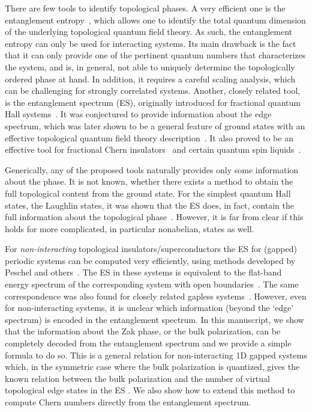 \documentclass[twocolumn,amsmath,longbibliography,amssymb,superscriptaddress]{revtex4-1}
\newcommand{\mariac}[1]{{\it\color{cyan}#1}}
\begin{document}
There are few tools to identify topological phases. 
A very efficient one is the entanglement entropy~\cite{Kitaev2006topological, Levin2006detecting}, which allows one to identify the total quantum dimension of the underlying topological quantum field theory. 
As such, the entanglement entropy can only be used for interacting systems. 
Its main drawback is the fact that it can only provide one of the pertinent quantum numbers that characterizes the system, and is, in general,  not able to uniquely determine the topologically ordered phase at hand. 
In addition, it requires a careful scaling analysis, which can be challenging for strongly correlated systems. 
Another, closely related tool, is the entanglement spectrum (ES), originally introduced for fractional quantum Hall systems~\cite{Li2008entanglement}. 
It was conjectured to provide information about the edge spectrum, which was later shown to be a general feature of ground states with an effective topological quantum field theory description~\cite{Qi2012general}. 
It also proved to be an effective tool for fractional Chern insulators~\cite{Regnault2011fractional} and certain quantum spin liquids~\cite{yao2010entanglement}. %

Generically, any of the proposed tools naturally provides only some information about the phase. It is not known, whether there exists a method to obtain the full topological content from the ground state. 
For the simplest quantum Hall states, the Laughlin states,  it was shown that the ES does, in fact, contain the full information about the topological phase~\cite{hermanns2011haldane}.
However, it is far from clear if this holds for more complicated, in particular nonabelian, states as well.  


For \emph{non-interacting} topological insulators/superconductors the ES for (gapped) periodic systems can be computed very efficiently, using methods developed by Peschel and others~\cite{Peschel2003}. The ES in these systems is equivalent to the flat-band energy spectrum of the corresponding system with open boundaries~\cite{Fidkowski2010entanglement}. The same correspondence was also found for closely related gapless systems~\cite{Matern2018entanglement}. However, even for non-interacting systems, it is unclear which information (beyond the  `edge' spectrum) is encoded in the entanglement spectrum. In this manuscript, we show that the information about the Zak phase, or the bulk polarization, can be completely decoded from the entanglement spectrum and we provide a simple formula to do so. This is a general relation for non-interacting 1D gapped systems which, in the symmetric case where the bulk polarization is quantized, gives the known relation between the bulk polarization and the number of virtual topological edge states in the ES \cite{Ryu2006}. We also show how to extend this method to compute Chern numbers directly from the entanglement spectrum. 
\end{document}
